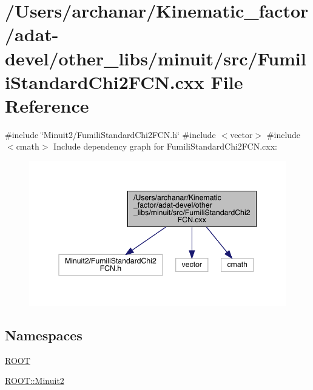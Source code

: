 \hypertarget{adat-devel_2other__libs_2minuit_2src_2FumiliStandardChi2FCN_8cxx}{}\section{/\+Users/archanar/\+Kinematic\+\_\+factor/adat-\/devel/other\+\_\+libs/minuit/src/\+Fumili\+Standard\+Chi2\+F\+CN.cxx File Reference}
\label{adat-devel_2other__libs_2minuit_2src_2FumiliStandardChi2FCN_8cxx}
{\ttfamily \#include \char`\"{}Minuit2/\+Fumili\+Standard\+Chi2\+F\+C\+N.\+h\char`\"{}}\newline
{\ttfamily \#include $<$vector$>$}\newline
{\ttfamily \#include $<$cmath$>$}\newline
Include dependency graph for Fumili\+Standard\+Chi2\+F\+C\+N.\+cxx\+:
\nopagebreak
\begin{figure}[H]
\begin{center}
\leavevmode
\includegraphics[width=345pt]{d4/d19/adat-devel_2other__libs_2minuit_2src_2FumiliStandardChi2FCN_8cxx__incl}
\end{center}
\end{figure}
\subsection*{Namespaces}
\begin{DoxyCompactItemize}
\item 
 \mbox{\hyperlink{namespaceROOT}{R\+O\+OT}}
\item 
 \mbox{\hyperlink{namespaceROOT_1_1Minuit2}{R\+O\+O\+T\+::\+Minuit2}}
\end{DoxyCompactItemize}
